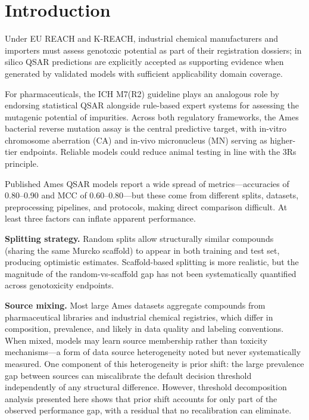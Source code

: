 \section{Introduction}

Under EU REACH\cite{EU_REACH_2006} and K-REACH,\cite{K_REACH_2018} industrial chemical 
manufacturers and importers must assess genotoxic potential as part of their registration 
dossiers; in silico QSAR predictions are explicitly accepted as supporting evidence when 
generated by validated models with sufficient applicability domain 
coverage.\cite{ECHA_QSAR_2008}

For pharmaceuticals, the ICH M7(R2) guideline plays an analogous role by endorsing 
statistical QSAR alongside rule-based expert systems for assessing the mutagenic potential 
of impurities.\cite{ICH_M7_2017} Across both regulatory frameworks, the Ames bacterial 
reverse mutation assay\cite{Ames_1973,Mortelmans_2000} is the central predictive target, 
with in-vitro chromosome aberration (CA) and in-vivo micronucleus 
(MN)\cite{OECD_473,OECD_474} serving as higher-tier endpoints. Reliable models could 
reduce animal testing in line with the 3Rs principle.\cite{Russell_Burch_1959}

Published Ames QSAR models report a wide spread of metrics---accuracies of 0.80--0.90 and 
MCC of 0.60--0.80\cite{Hansen_2009,Xu_2012,Honma_2019,Li_2021}---but these come from 
different splits, datasets, preprocessing pipelines, and protocols, making direct comparison 
difficult. At least three factors can inflate apparent performance.

\textbf{Splitting strategy.} Random splits allow structurally similar compounds (sharing the 
same Murcko scaffold\cite{Bemis_Murcko_1996}) to appear in both training and test set, 
producing optimistic estimates. Scaffold-based 
splitting\cite{Sheridan_2013,Wu_MoleculeNet_2018} is more realistic, but the magnitude of 
the random-vs-scaffold gap has not been systematically quantified across genotoxicity 
endpoints.

\textbf{Source mixing.} Most large Ames datasets aggregate compounds from pharmaceutical 
libraries and industrial chemical registries,\cite{Hansen_2009,Honma_2019} which differ in 
composition, prevalence, and likely in data quality and labeling conventions. When mixed, 
models may learn source membership rather than toxicity mechanisms---a form of data source 
heterogeneity noted\cite{Tropsha_2010,Hanser_2016} but never systematically measured. One 
component of this heterogeneity is prior shift: the large prevalence gap between sources can 
miscalibrate the default decision threshold independently of any structural difference. 
However, threshold decomposition analysis presented here shows that prior shift accounts for 
only part of the observed performance gap, with a residual that no recalibration can 
eliminate.

